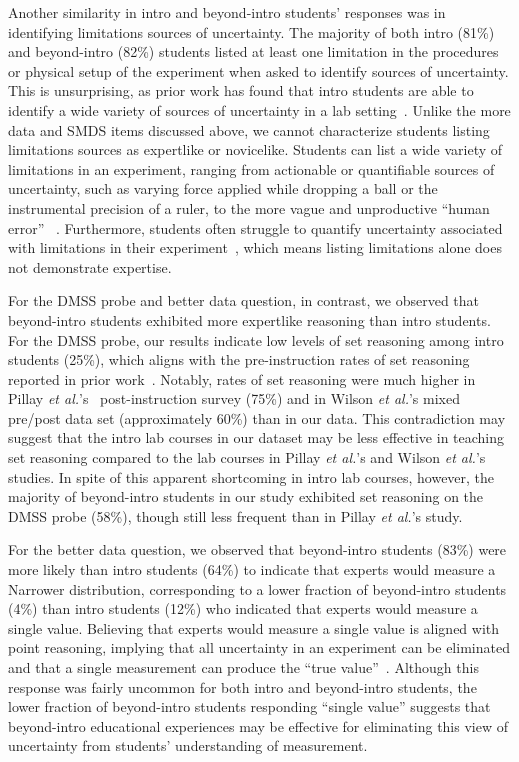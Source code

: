 \documentclass[english,aps,prstper,reprint,showpacs,longbibliography,superscriptaddress,nofootinbib]{revtex4-2}
\begin{document}
Another similarity in intro and beyond-intro students' responses was in identifying limitations sources of uncertainty. The majority of both intro (81\%) and beyond-intro (82\%) students listed at least one limitation in the procedures or physical setup of the experiment when asked to identify sources of uncertainty. This is unsurprising, as prior work has found that intro students are able to identify a wide variety of sources of uncertainty in a lab setting~\cite{Holmes2015,Etkina2008,Sere1993}. Unlike the more data and SMDS items discussed above, we cannot characterize students listing limitations sources as expertlike or novicelike. Students can list a wide variety of limitations in an experiment, ranging from actionable or quantifiable sources of uncertainty, such as varying force applied while dropping a ball or the instrumental precision of a ruler, to the more vague and unproductive ``human error''~\cite{Hu2018,Holmes2015,Sere2001,Evangelinos2002,Allie2003} . Furthermore, students often struggle to quantify uncertainty associated with limitations in their experiment~\cite{Sere1993,Etkina2008}, which means listing limitations alone does not demonstrate expertise.

For the DMSS probe and better data question, in contrast, we observed that beyond-intro students exhibited more expertlike reasoning than intro students. For the DMSS probe, our results indicate low levels of set reasoning among intro students (25\%), which aligns with the pre-instruction rates of set reasoning reported in prior work~\cite{Pillay2008,Allie1998}. Notably, rates of set reasoning were much higher in Pillay \textit{et al.}'s~\cite{Pillay2008} post-instruction survey (75\%) and in Wilson \textit{et al.}'s mixed pre/post data set (approximately 60\%) than in our data. This contradiction may suggest that the intro lab courses in our dataset may be less effective in teaching set reasoning compared to the lab courses in Pillay \textit{et al.}'s and Wilson \textit{et al.}'s studies. In spite of this apparent shortcoming in intro lab courses, however, the majority of beyond-intro students in our study exhibited set reasoning on the DMSS probe (58\%), though still less frequent than in Pillay \textit{et al.}'s study.

For the better data question, we observed that beyond-intro students (83\%) were more likely than intro students (64\%) to indicate that experts would measure a Narrower distribution, corresponding to a lower fraction of beyond-intro students (4\%) than intro students (12\%) who indicated that experts would measure a single value. Believing that experts would measure a single value is aligned with point reasoning, implying that all uncertainty in an experiment can be eliminated and that a single measurement can produce the ``true value''~\cite{Allie1998,Buffler2001,Lubben2001,Leach1998,Evangelinos1999}. Although this response was fairly uncommon for both intro and beyond-intro students, the lower fraction of beyond-intro students responding ``single value'' suggests that beyond-intro educational experiences may be effective for eliminating this view of uncertainty from students' understanding of measurement.
\end{document}
